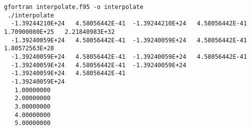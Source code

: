 \begin{Verbatim}[frame=lines,label=interpolate - commands and output]
 gfortran interpolate.f95 -o interpolate
 ./interpolate
  -1.39244210E+24   4.58056442E-41  -1.39244210E+24   4.58056442E-41   1.70900080E+25   2.21840983E+32
  -1.39240059E+24   4.58056442E-41  -1.39240059E+24   4.58056442E-41   1.80572563E+28
  -1.39240059E+24   4.58056442E-41  -1.39240059E+24   4.58056442E-41
  -1.39240059E+24   4.58056442E-41  -1.39240059E+24
  -1.39240059E+24   4.58056442E-41
  -1.39240059E+24
   1.00000000    
   2.00000000    
   3.00000000    
   4.00000000    
   5.00000000    
\end{Verbatim}
